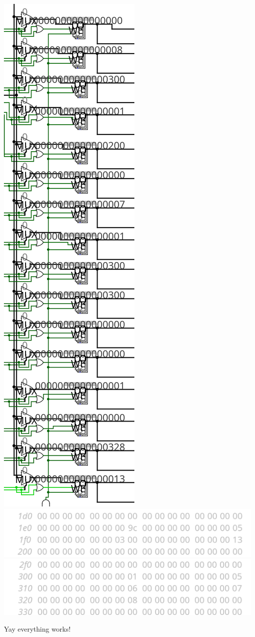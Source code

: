\documentclass{article}
\begin{document}
\begin{center}
    \includegraphics[scale=.4]{sortReg.png} 
    \includegraphics[scale=.5]{sortMem1.png} 
    \includegraphics[scale=.5]{sortMem2.png} 
\end{center}
Yay everything works!
\end{document}
